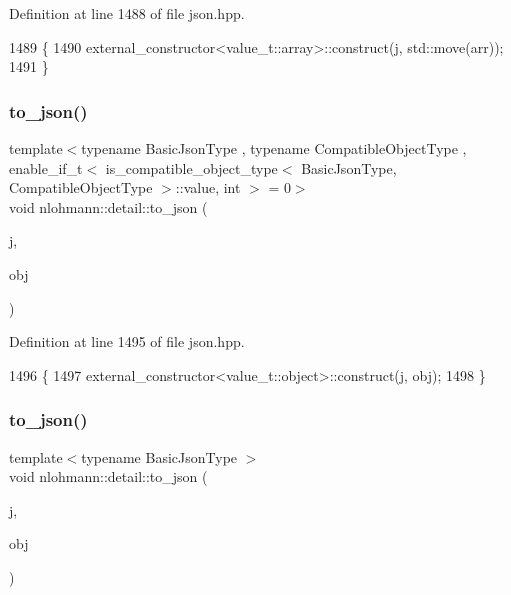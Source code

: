 Definition at line 1488 of file json.\+hpp.


\begin{DoxyCode}
1489 \{
1490     external\_constructor<value\_t::array>::construct(j, std::move(arr));
1491 \}
\end{DoxyCode}
\mbox{\label{namespacenlohmann_1_1detail_a24c9c12f3839c94e09532f08de85e949}} 
\subsubsection{\texorpdfstring{to\+\_\+json()}{to\_json()}\hspace{0.1cm}{\footnotesize\ttfamily [12/16]}}
{\footnotesize\ttfamily template$<$typename Basic\+Json\+Type , typename Compatible\+Object\+Type , enable\+\_\+if\+\_\+t$<$ is\+\_\+compatible\+\_\+object\+\_\+type$<$ Basic\+Json\+Type, Compatible\+Object\+Type $>$\+::value, int $>$  = 0$>$ \\
void nlohmann\+::detail\+::to\+\_\+json (\begin{DoxyParamCaption}\item[{Basic\+Json\+Type \&}]{j,  }\item[{const Compatible\+Object\+Type \&}]{obj }\end{DoxyParamCaption})}



Definition at line 1495 of file json.\+hpp.


\begin{DoxyCode}
1496 \{
1497     external\_constructor<value\_t::object>::construct(j, obj);
1498 \}
\end{DoxyCode}
\mbox{\label{namespacenlohmann_1_1detail_ac9f7a5542851c61d93740148eaec509f}} 
\subsubsection{\texorpdfstring{to\+\_\+json()}{to\_json()}\hspace{0.1cm}{\footnotesize\ttfamily [13/16]}}
{\footnotesize\ttfamily template$<$typename Basic\+Json\+Type $>$ \\
void nlohmann\+::detail\+::to\+\_\+json (\begin{DoxyParamCaption}\item[{Basic\+Json\+Type \&}]{j,  }\item[{typename Basic\+Json\+Type\+::object\+\_\+t \&\&}]{obj }\end{DoxyParamCaption})}



